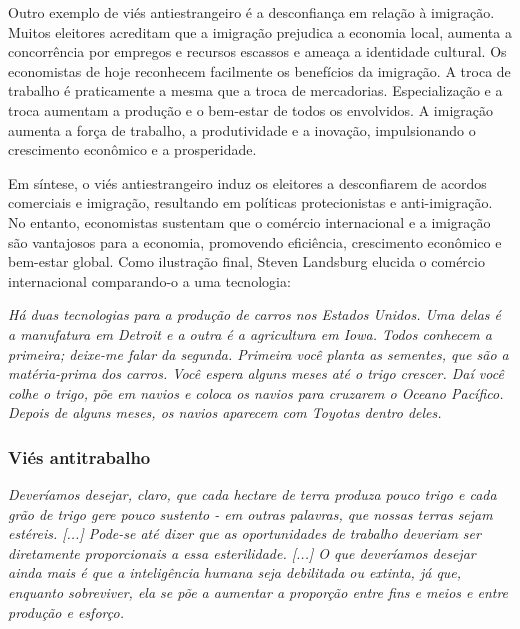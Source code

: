 Outro exemplo de viés antiestrangeiro é a desconfiança em relação à imigração. Muitos eleitores acreditam que a imigração prejudica a economia local, aumenta a concorrência por empregos e recursos escassos e ameaça a identidade cultural. Os economistas de hoje reconhecem facilmente os benefícios da imigração. A troca de trabalho é praticamente a mesma que a troca de mercadorias. Especialização e a troca aumentam a produção e o bem-estar de todos os envolvidos. A imigração aumenta a força de trabalho, a produtividade e a inovação, impulsionando o crescimento econômico e a prosperidade.

Em síntese, o viés antiestrangeiro induz os eleitores a desconfiarem de acordos comerciais e imigração, resultando em políticas protecionistas e anti-imigração. No entanto, economistas sustentam que o comércio internacional e a imigração são vantajosos para a economia, promovendo eficiência, crescimento econômico e bem-estar global. Como ilustração final, Steven Landsburg elucida o comércio internacional comparando-o a uma tecnologia:

\begin{citacao}
    \textit{
        Há duas tecnologias para a produção de carros nos Estados Unidos. Uma delas é a manufatura em Detroit e a outra é a agricultura em Iowa. Todos conhecem a primeira; deixe-me falar da segunda. Primeira você planta as sementes, que são a matéria-prima dos carros. Você espera alguns meses até o trigo crescer. Daí você colhe o trigo, põe em navios e coloca os navios para cruzarem o Oceano Pacífico. Depois de alguns meses, os navios aparecem com Toyotas dentro deles.
    } \newline
    \cite{landsburg2012armchair}
\end{citacao}


\subsubsection{Viés antitrabalho}

\begin{citacao}
    \textit{
        Deveríamos desejar, claro, que cada hectare de terra produza pouco trigo e cada grão de trigo gere pouco sustento - em outras palavras, que nossas terras sejam estéreis. [...] Pode-se até dizer que as oportunidades de trabalho deveriam ser diretamente proporcionais a essa esterilidade. [...] O que deveríamos desejar ainda mais é que a inteligência humana seja debilitada ou extinta, já que, enquanto sobreviver, ela se põe a aumentar a proporção entre fins e meios e entre produção e esforço.
    } \newline
    \cite{bastiat1859sofismas}
\end{citacao}


